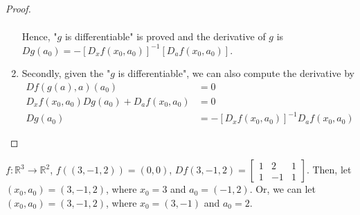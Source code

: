 \documentclass[11pt]{elegantbook}
\begin{document}
\begin{proof}
\begin{enumerate}
\begin{equation}
\begin{aligned}
            \end{aligned}
            \nonumber
        \end{equation}
        Hence, "$g$ is differentiable" is proved and the derivative of $g$ is $Dg(a_0)=-[D_x f(x_0,a_0)]^{-1}[D_a f(x_0,a_0)]$.
        \item Secondly, given the "$g$ is differentiable", we can also compute the derivative by
        \begin{equation}
            \begin{aligned}
                Df(g(a),a)(a_0)&=0\\
                D_xf(x_0,a_0)Dg(a_0)+D_af(x_0,a_0)&=0\\
                Dg(a_0)&=-[D_x f(x_0,a_0)]^{-1}D_a f(x_0,a_0)
            \end{aligned}
            \nonumber
        \end{equation}
    \end{enumerate}
\end{proof}







\begin{example}
    $f: \mathbb{R}^3 \rightarrow \mathbb{R}^2$, $f((3,-1,2))=(0,0)$, $Df(3,-1,2)=\begin{bmatrix}
        1&2&1\\
        1&-1&1
    \end{bmatrix}$. Then,
    let $(x_0,a_0)=(3,-1,2)$, where $x_0=3$ and $a_0=(-1,2)$. Or, we can let $(x_0,a_0)=(3,-1,2)$, where $x_0=(3,-1)$ and $a_0=2$.
\end{example}
\end{document}
